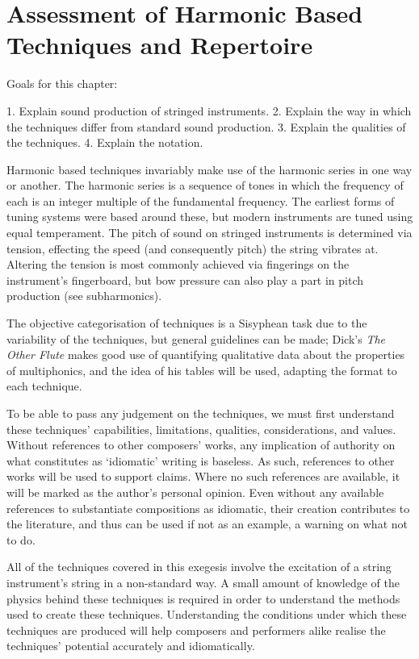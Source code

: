 
\chapter{Assessment of Harmonic Based Techniques and Repertoire}

Goals for this chapter:

1. Explain sound production of stringed instruments.
2. Explain the way in which the techniques differ from standard sound production.
3. Explain the qualities of the techniques.
4. Explain the notation.



Harmonic based techniques invariably make use of the harmonic series in one way or another. 
The harmonic series is a sequence of tones in which the frequency of each is an integer multiple of the fundamental frequency. 
The earliest forms of tuning systems were based around these, but modern instruments are tuned using equal temperament. 
The pitch of sound on stringed instruments is determined via tension, effecting the speed (and consequently pitch) the string vibrates at. 
Altering the tension is most commonly achieved via fingerings on the instrument's fingerboard, but bow pressure can also play a part in pitch production (see subharmonics).

The objective categorisation of techniques is a Sisyphean task due to the variability of the techniques, but general guidelines can be made; Dick's \emph{The Other Flute} makes good use of quantifying qualitative data about the properties of multiphonics, and the idea of his tables will be used, adapting the format to each technique.\autocite[84]{dickOtherFlute1989}

To be able to pass any judgement on the techniques, we must first understand these techniques' capabilities, limitations, qualities, considerations, and values. 
Without references to other composers' works, any implication of authority on what constitutes as `idiomatic' writing is baseless. 
As such, references to other works will be used to support claims. 
Where no such references are available, it will be marked as the author's personal opinion. 
Even without any available references to substantiate compositions as idiomatic, their creation contributes to the literature, and thus can be used if not as an example, a warning on what not to do. 

All of the techniques covered in this exegesis involve the excitation of a string instrument's string in a non-standard way. 
A small amount of knowledge of the physics behind these techniques is required in order to understand the methods used to create these techniques.
Understanding the conditions under which these techniques are produced will help composers and performers alike realise the techniques' potential accurately and idiomatically.

